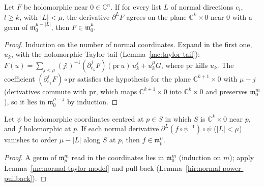 \begin{lemma}
\label{mc:normal-taylor-model}
\leanok
Let \(F\) be holomorphic near \(0\in\mathbb C^n\). If for every list \(L\) of normal directions \(e_l\), \(l\ge k\), with \(|L|<\mu\), the derivative \(\partial^LF\)
agrees on the plane \(\mathbb C^k\times0\) near \(0\) with a germ of \(\mathfrak m_0^{\mu-|L|}\), then \(F\in\mathfrak m_0^\mu\).
\end{lemma}
\begin{proof}
\leanok
Induction on the number of normal coordinates. Expand in the first one, \(u_k\), with the holomorphic Taylor tail (Lemma~\ref{mc:taylor-tail}):
\(F(u)=\sum_{j<\mu}(j!)^{-1}(\partial^j_{e_k}F)(\mathrm{pr}\,u)\,u_k^j+u_k^\mu G\), where \(\mathrm{pr}\) kills \(u_k\). The coefficient
\((\partial^j_{e_k}F)\circ\mathrm{pr}\) satisfies the hypothesis for the plane \(\mathbb C^{k+1}\times0\) with \(\mu-j\) (derivatives commute with \(\mathrm{pr}\),
which maps \(\mathbb C^{k+1}\times0\) into \(\mathbb C^k\times0\) and preserves \(\mathfrak m_0^m\)), so it lies in \(\mathfrak m_0^{\mu-j}\) by induction.
\end{proof}

\begin{lemma}
\label{mc:normal-taylor-order}
\leanok
Let \(\psi\) be holomorphic coordinates centred at \(p\in S\) in which \(S\) is \(\mathbb C^k\times0\) near \(p\), and \(f\) holomorphic at \(p\). If each normal
derivative \(\partial^L(f\circ\psi^{-1})\circ\psi\) (\(|L|<\mu\)) vanishes to order \(\mu-|L|\) along \(S\) at \(p\), then \(f\in\mathfrak m_p^\mu\).
\end{lemma}
\begin{proof}
\leanok
A germ of \(\mathfrak m_p^m\) read in the coordinates lies in \(\mathfrak m_0^m\) (induction on \(m\)); apply Lemma~\ref{mc:normal-taylor-model} and pull back
(Lemma~\ref{hir:normal-power-pullback}).
\end{proof}

